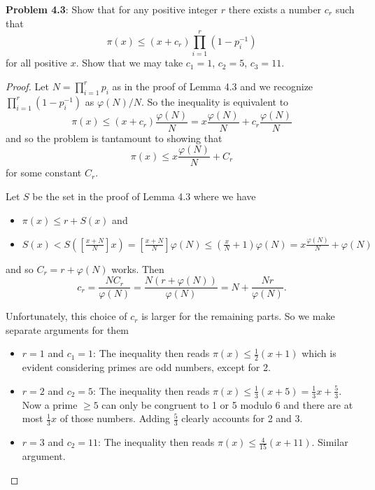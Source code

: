 \documentclass[12pt]{article}
\newcommand{\IntPart}[1]{\left[ #1 \right]}
\begin{document}
\fi

\textbf{Problem 4.3}: Show that for any positive integer $r$ there exists a number $c_r$ such that
$$\pi(x) \leq (x + c_r) \prod_{i=1}^{r} (1 - p_i^{-1})$$
for all positive $x$. Show that we may take $c_1 = 1$, $c_2 = 5$, $c_3 = 11$.

\begin{proof}
Let $N = \prod_{i = 1}^r p_i$ as in the proof of Lemma 4.3 and we recognize $\prod_{i=1}^{r} (1 - p_i^{-1})$ as $\varphi(N) / N$. So the inequality is equivalent to
$$\pi(x) \leq (x + c_r) \frac{\varphi(N)}{N} = x \frac{\varphi(N)}{N} + c_r \frac{\varphi(N)}{N}$$
and so the problem is tantamount to showing that
$$\pi(x) \leq x \frac{\varphi(N)}{N} + C_r$$
for some constant $C_r$.

Let $S$ be the set in the proof of Lemma 4.3 where we have
\begin{itemize}
\item $\pi(x) \leq r + S(x)$ and
\item $S(x) < S\left(\IntPart{ \frac{x + N}{N} } x\right) = \IntPart{ \frac{x + N}{N} } \varphi(N) \leq \left( \frac{x}{N} + 1 \right) \varphi(N) = x \frac{\varphi(N)}{N} + \varphi(N)$
\end{itemize}
and so $C_r = r + \varphi(N)$ works. Then
$$c_r = \frac{N C_r}{\varphi(N)} = \frac{N (r + \varphi(N))}{\varphi(N)} = N + \frac{N r}{\varphi(N)}.$$

Unfortunately, this choice of $c_r$ is larger for the remaining parts. So we make separate arguments for them
\begin{itemize}
\item $r = 1$ and $c_1 = 1$: The inequality then reads $\pi(x) \leq \frac12 (x + 1)$ which is evident considering primes are odd numbers, except for 2.
\item $r = 2$ and $c_2 = 5$: The inequality then reads $\pi(x) \leq \frac13 (x + 5) = \frac13 x + \frac53$. Now a prime $\geq 5$ can only be congruent to 1 or 5 modulo 6 and there are at most $\frac13x$ of those numbers. Adding $\frac53$ clearly accounts for 2 and 3.
\item $r = 3$ and $c_2 = 11$: The inequality then reads $\pi(x) \leq \frac4{15} (x + 11)$. Similar argument.
\end{itemize}
\end{proof}

\unless\ifdefined\IsMainDocument
\end{document}
